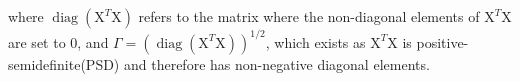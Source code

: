 \documentclass{homework}
\begin{document}
where $\operatorname{diag}\left(\mathrm{X}^{T} \mathrm{X}\right)$ refers to the matrix where the non-diagonal elements of $\mathrm{X}^{T} \mathrm{X}$ are set to 0, and $\Gamma=\left(\operatorname{diag}\left(\mathrm{X}^{T} \mathrm{X}\right)\right)^{1 / 2}$, which exists as $\mathrm{X}^{T} \mathrm{X}$ is positive-semidefinite(PSD) and therefore has non-negative diagonal elements.



\end{document}
